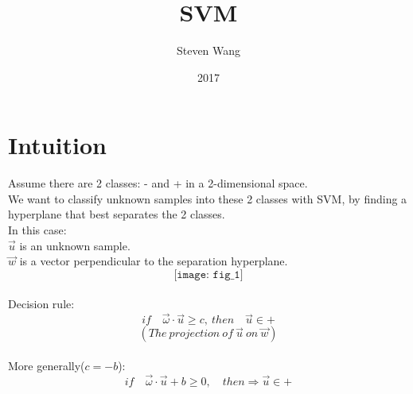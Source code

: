 \documentclass{article}
\title{SVM}
\author{Steven Wang}
\date{2017}
\begin{document}
\maketitle

\section{Intuition}
Assume there are 2 classes: - and + in a 2-dimensional space.
\\
We want to classify unknown samples into these 2 classes with SVM, by finding a hyperplane that best separates the 2 classes.
\\
In this case:
\\
\indent $\vec{u}$ is an unknown sample.
\\
\indent $\vec{w}$ is a vector perpendicular to the separation hyperplane.
\[
\texttt{[image: fig\_1]}
\]
\\
Decision rule:
$$if\quad\vec{\omega}\cdot\vec{u}\geq c,\ then\quad\vec{u}\in+$$
$$(The\ projection\ of\ \vec{u}\ on\ \vec{w})$$
\\
More generally($c=-b$):
\\

\begin{equation} \label{eq:someequation}
    if\quad\vec{\omega}\cdot\vec{u}+b\geq0, \quad then \Rightarrow \vec{u}\in+
\end{equation}
\end{document}
